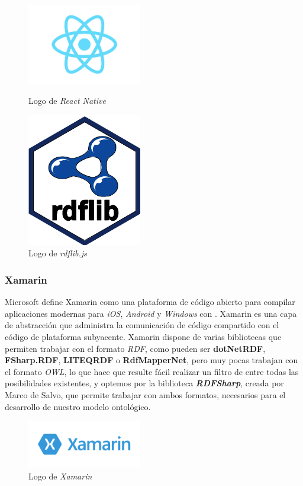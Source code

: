 \begin{figure}[H]
    \centering
    \begin{minipage}{5cm}
        \centering
        \includegraphics[width=5cm]{Images/Logo_React.jpeg}
        \caption{Logo de \textit{React Native}}  
    \end{minipage}
    \hfill
    \begin{minipage}{5cm}
        \centering
        \includegraphics[width=5cm]{Images/Logo_Rdflib.jpeg}
        \caption{Logo de \textit{rdflib.js}}  
    \end{minipage}
\end{figure}

\subsubsection{Xamarin}
Microsoft define Xamarin como una plataforma de código abierto para compilar aplicaciones modernas para \textit{iOS}, 
\textit{Android} y \textit{Windows} con \textit{\dotnet} \autocite*{Xamarin}. Xamarin es una capa de abstracción que administra la comunicación 
de código compartido con el código de plataforma subyacente. Xamarin dispone de varias bibliotecas que permiten trabajar con 
el formato \textit{RDF}, como pueden ser \textbf{dotNetRDF}, \textbf{FSharp.RDF}, \textbf{LITEQRDF} o \textbf{RdfMapperNet}, 
pero muy pocas trabajan con el formato \textit{OWL}, lo que hace que resulte fácil realizar un filtro de entre todas las 
posibilidades existentes, y optemos por la biblioteca \textit{\textbf{RDFSharp}}, creada por Marco de Salvo, que permite 
trabajar con ambos formatos, necesarios para el desarrollo de nuestro modelo ontológico.

\begin{figure}[H]
    \centering
    \includegraphics[width=5cm]{Images/Logo_Xamarin.png}
    \caption{Logo de \textit{Xamarin}}
\end{figure}
